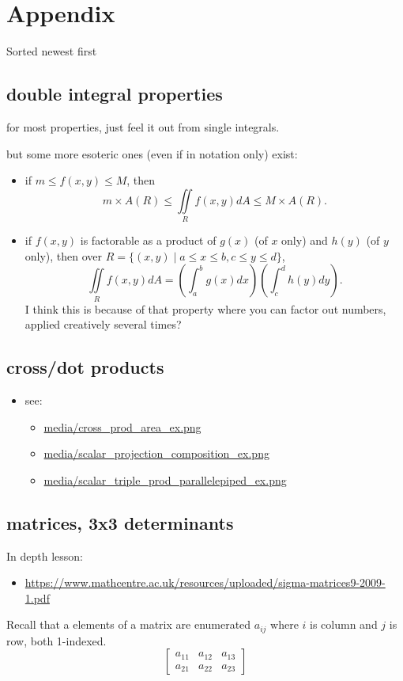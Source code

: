 \documentclass[11pt]{article}
\theoremstyle{definition}
\newcommand{\addsection}[1]{\section*{#1}\addcontentsline{toc}{section}{#1}} %
\begin{document}
\newpage
\addsection{Appendix} 
Sorted newest first

\subsection*{double integral properties}
for most properties, just feel it out from single integrals.

but some more esoteric ones (even if in notation only) exist:
\begin{itemize}
  \item if $m \le f(x,y) \le M$, then
  \[ m\times A(R) \le \iint\limits_R f(x,y)dA \le M \times A(R).\]
  \item if $f(x,y)$ is factorable as a product of $g(x)$ (of $x$ only) and $h(y)$ (of $y$ only), then over $R = \{(x,y) \mid a\le x\le b, c\le y\le d\}$,
  \[\iint\limits_R f(x,y)dA  = \left(\int_{a}^{b}g(x)dx\right)\left(\int_{c}^{d}h(y)dy\right).\]
  I think this is because of that property where you can factor out numbers, applied creatively several times?
\end{itemize}

\subsection*{cross/dot products}
\begin{itemize}
  \item see:
  \begin{itemize}
    \item \url{media/cross_prod_area_ex.png}
    \item \url{media/scalar_projection_composition_ex.png}
    \item \url{media/scalar_triple_prod_parallelepiped_ex.png}
  \end{itemize}
\end{itemize}
\subsection*{matrices, 3x3 determinants}
In depth lesson:
\begin{itemize}
  \item \url{https://www.mathcentre.ac.uk/resources/uploaded/sigma-matrices9-2009-1.pdf}
\end{itemize}

Recall that a elements of a matrix are enumerated $a_{ij}$ where $i$ is column and $j$ is row, both 1-indexed. 
\[\begin{bmatrix}
  a_{11} & a_{12} & a_{13}\\
  a_{21} & a_{22} & a_{23}
\end{bmatrix}\]
\end{document}
